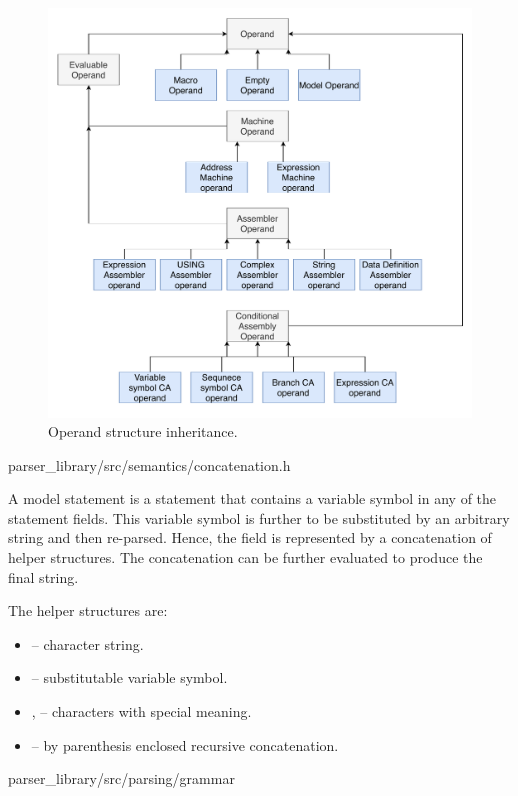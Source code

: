 \begin{figure}
	\centering
	\includegraphics[width=\textwidth]{img/operand_arch}
	\caption{Operand structure inheritance.}
	\label{fig06:operand_arch}
\end{figure}

{parser\_library/src/semantics/concatenation.h}

A model statement is a statement that contains a variable symbol in any of the statement fields. This variable symbol is further to be substituted by an arbitrary string and then re-parsed. Hence, the field is represented by a concatenation of helper structures. The concatenation can be further evaluated to produce the final string.

The helper structures are:
\begin{itemize}
	\item {} -- character string.
	\item {} -- substitutable variable symbol.
	\item {},  -- characters with special meaning.
	\item {} -- by parenthesis enclosed recursive concatenation.
\end{itemize}

{parser\_library/src/parsing/grammar}

